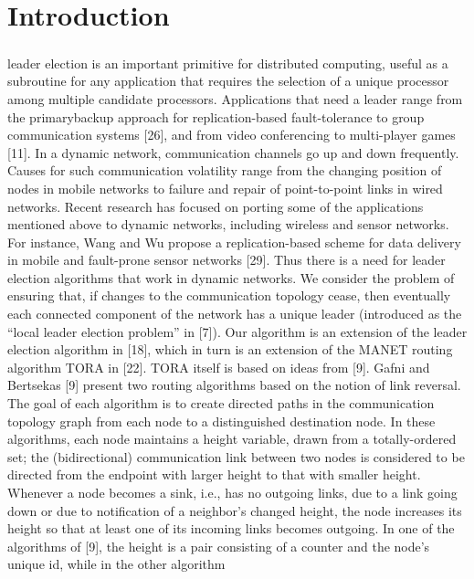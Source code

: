 \chapter{Introduction}

\paragraph{}leader election is an important primitive for distributed computing, useful as a subroutine for any application that requires the selection of a unique processor among
multiple candidate processors. Applications that need a leader range from the primarybackup approach for replication-based fault-tolerance to group communication systems [26], and from video conferencing to multi-player games [11].
In a dynamic network, communication channels go up and down frequently. Causes
for such communication volatility range from the changing position of nodes in mobile networks to failure and repair of point-to-point links in wired networks. Recent
research has focused on porting some of the applications mentioned above to dynamic networks, including wireless and sensor networks. For instance, Wang and Wu
propose a replication-based scheme for data delivery in mobile and fault-prone sensor networks [29]. Thus there is a need for leader election algorithms that work in
dynamic networks.
We consider the problem of ensuring that, if changes to the communication topology cease, then eventually each connected component of the network has a unique
leader (introduced as the “local leader election problem” in [7]). Our algorithm is an
extension of the leader election algorithm in [18], which in turn is an extension of the
MANET routing algorithm TORA in [22]. TORA itself is based on ideas from [9].
Gafni and Bertsekas [9] present two routing algorithms based on the notion of link
reversal. The goal of each algorithm is to create directed paths in the communication
topology graph from each node to a distinguished destination node. In these algorithms, each node maintains a height variable, drawn from a totally-ordered set; the
(bidirectional) communication link between two nodes is considered to be directed
from the endpoint with larger height to that with smaller height. Whenever a node
becomes a sink, i.e., has no outgoing links, due to a link going down or due to notification of a neighbor’s changed height, the node increases its height so that at least one
of its incoming links becomes outgoing. In one of the algorithms of [9], the height is
a pair consisting of a counter and the node’s unique id, while in the other algorithm
